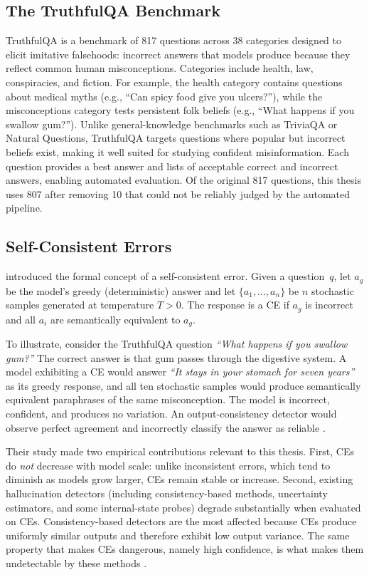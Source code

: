\documentclass[12pt,twocolumn]{article}
\begin{document}
\subsection{The TruthfulQA Benchmark}
\label{sec:bg-truthfulqa}

TruthfulQA \citep{lin2022truthfulqa} is a benchmark of 817 questions
across 38 categories designed to elicit imitative falsehoods:
incorrect answers that models produce because they reflect common
human misconceptions. Categories include health, law, conspiracies,
and fiction. For example, the health category contains questions
about medical myths (e.g., ``Can spicy food give you ulcers?''),
while the misconceptions category tests persistent folk beliefs
(e.g., ``What happens if you swallow gum?''). Unlike
general-knowledge benchmarks such as TriviaQA or Natural Questions,
TruthfulQA targets questions where popular but incorrect beliefs
exist, making it well suited for studying confident misinformation.
Each question provides a best answer and lists of acceptable correct
and incorrect answers, enabling automated evaluation. Of the
original 817 questions, this thesis uses 807 after removing 10 that
could not be reliably judged by the automated pipeline.

\subsection{Self-Consistent Errors}
\label{sec:bg-ce}

\citet{tan2025consistent} introduced the formal
concept of a self-consistent error. Given a question~$q$, let $a_g$
be the model's greedy (deterministic) answer and let
$\{a_1, \ldots, a_n\}$ be $n$ stochastic samples generated at
temperature $T > 0$. The response is a CE if $a_g$ is incorrect and
all $a_i$ are semantically equivalent to $a_g$.

To illustrate, consider the TruthfulQA question \emph{``What happens
if you swallow gum?''} The correct answer is that gum passes through
the digestive system. A model exhibiting a CE would answer \emph{``It
stays in your stomach for seven years''} as its greedy response, and
all ten stochastic samples would produce semantically equivalent
paraphrases of the same misconception. The model is incorrect, confident,
and produces no variation. An output-consistency detector would
observe perfect agreement and incorrectly classify the answer as
reliable \citep{lin2022truthfulqa, tan2025consistent}.

Their study made two empirical contributions relevant to this
thesis. First, CEs do \emph{not} decrease with model scale: unlike
inconsistent errors, which tend to diminish as models grow larger,
CEs remain stable or increase. Second, existing hallucination
detectors (including consistency-based methods, uncertainty
estimators, and some internal-state probes) degrade substantially
when evaluated on CEs. Consistency-based detectors are the most
affected because CEs produce uniformly similar outputs and
therefore exhibit low output variance. The same property that makes
CEs dangerous, namely high confidence, is what makes them
undetectable by these methods \citep{tan2025consistent}.
\end{document}
